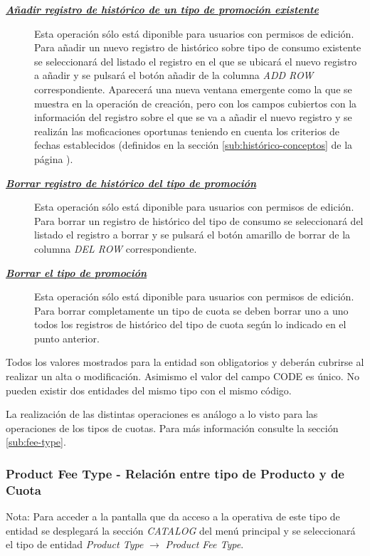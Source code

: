 \begin{description}
\item[\underline{\textsl{\textbf{Añadir registro de histórico de un tipo de promoción existente}}}] Esta operación sólo está diponible para usuarios con permisos de edición.
Para añadir un nuevo registro de histórico sobre tipo de consumo existente se seleccionará del listado el registro en el que se ubicará el nuevo registro a añadir 
y se pulsará el botón añadir de la columna \textit{ADD ROW} correspondiente. Aparecerá una nueva ventana emergente como la que se muestra en la operación de creación, pero con los campos cubiertos con la información del registro sobre el que se va a añadir el nuevo registro y se realizán las moficaciones oportunas teniendo en cuenta los criterios de fechas establecidos (definidos en la sección \ref{sub:histórico-conceptos} de la página \pageref{sub:histórico-conceptos}).

\item[\underline{\textsl{\textbf{Borrar registro de histórico del tipo de promoción}}}] Esta operación sólo está diponible para usuarios con permisos de edición.
Para borrar un registro de histórico del tipo de consumo se seleccionará del listado el registro a borrar y se pulsará el botón amarillo de borrar de la columna \textit{DEL ROW} correspondiente.

\item[\underline{\textsl{\textbf{Borrar el tipo de promoción}}}] Esta operación sólo está diponible para usuarios con permisos de edición.
Para borrar completamente un tipo de cuota se deben borrar uno a uno todos los registros de histórico del tipo de cuota según lo indicado en el punto anterior.
\end{description}

Todos los valores mostrados para la entidad son obligatorios y deberán cubrirse al realizar un alta o modificación. Asimismo el valor del campo CODE es único. No pueden existir dos entidades del mismo tipo con el mismo código.

La realización de las distintas operaciones es análogo a lo visto para las operaciones de los tipos de cuotas. Para más información consulte la sección \ref{sub:fee-type}.


\subsubsection{Product Fee Type - Relación entre tipo de Producto y de Cuota}
\label{sub:product-fee-type-relation}

Nota: Para acceder a la pantalla que da acceso a la operativa de este tipo de entidad se desplegará la sección \emph{CATALOG} del menú principal y se seleccionará el tipo de entidad \emph{Product Type} $\rightarrow$  \emph{Product Fee Type}.


